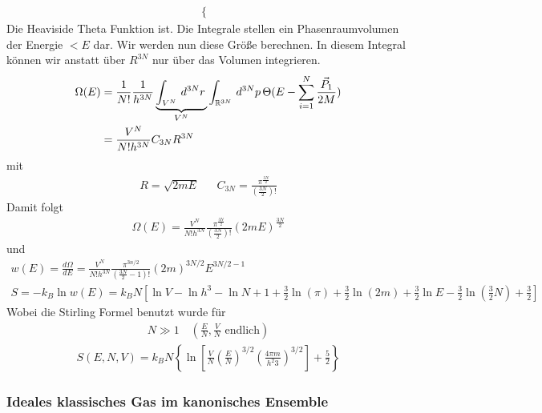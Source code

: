 \begin{description}
\begin{align*}
\begin{cases}
        \end{cases}
      \end{align*}
      Die Heaviside Theta Funktion ist.
      Die Integrale stellen ein Phasenraumvolumen der Energie $< E $ dar.
      Wir werden nun diese Gr\"o\ss{}e berechnen. In diesem Integral k\"onnen
      wir anstatt \"uber $R^{3N}$ nur \"uber das Volumen integrieren.
      \begin{align*}
        \Omega(E) & = \frac{1}{N!} \frac{1}{h^{3N}} \underbrace{\int_{V^N}^{} \,d^{3N} r\,}_{V^N}
        \int_{\mathbb{R}^{3N}}^{} \,d^{3N} p\, \Theta(E-\sum_{i=1}^{N} \frac{\vec{P}_1}{2M}) \\
        & = \frac{V^N}{ N! h^{3N}} C_{3N} R ^{3N}
      \end{align*}
      mit %
      \begin{align*}
        R = \sqrt{2 m E} && C_{3N} = \frac{\pi^\frac{3N}{2}}{(\frac{3N}{2})!}
      \end{align*}
      Damit folgt
      \begin{align*}
        \Omega(E) = \frac{V^N}{N! h^{3N}} \frac{\pi^\frac{3N}{2}}{(\frac{3N}{2})!}
        (2mE)^\frac{3N}{2}
      \end{align*}
      und 
      \begin{align*}
        w(E) = \frac{d\Omega}{dE} = \frac{V^N}{N! h^{3N}} \frac{\pi^{3 n / 2}}{
        (\frac{3N}{2} - 1)!} (2 m )^{3 N / 2} E ^{ 3 N /2 - 1} \\
        S = - k_B \ln{w(E)} = k_B N \left[ \ln{V} - \ln{h^3} - \ln{N}
        + 1 + \frac{3}{2} \ln{(\pi) } + \frac{3}{2} \ln{(2m)} + \frac{3}{2} \ln{E}
      - \frac{3}{2} \ln{(\frac{3}{2} N)} + \frac{3}{2}\right]
      \end{align*}
      Wobei die Stirling Formel benutzt wurde f\"ur
      \begin{align*}
        N \gg 1 \quad \left(\frac{E}{N}, \frac{V}{N} \text{ endlich}\right)
      \end{align*}
      \begin{align*}
        S(E, N, V) = k_B N \left\{  \ln{ \left[ 
              \frac{V}{N} \left( \frac{E}{N} \right)^{3 / 2} \left( 
        \frac{4 \pi m }{ h^2 3}\right)^{3 / 2} \right] } + \frac{5}{2} \right\}
      \end{align*}
      
\end{description}
\subsubsection*{Ideales klassisches Gas im kanonisches Ensemble}

